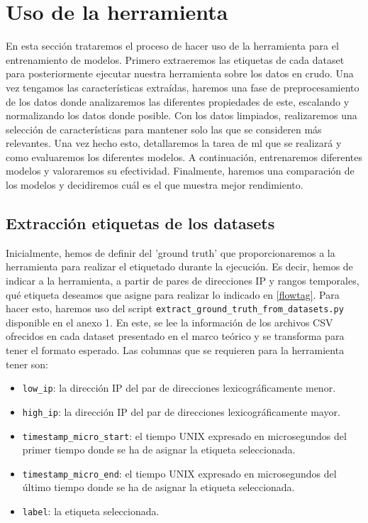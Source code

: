 \color{blue} %
\section{Uso de la herramienta}

En esta sección trataremos el proceso de hacer uso de la herramienta para el entrenamiento de modelos. Primero extraeremos las etiquetas de cada dataset para posteriormente ejecutar nuestra herramienta sobre los datos en crudo. Una vez tengamos las características extraídas, haremos una fase de preprocesamiento de los datos donde analizaremos las diferentes propiedades de este, escalando y normalizando los datos donde posible. Con los datos limpiados, realizaremos una selección de características para mantener solo las que se consideren más relevantes. Una vez hecho esto, detallaremos la tarea de \gls{ml} que se realizará y como evaluaremos los diferentes modelos. A continuación, entrenaremos diferentes modelos y valoraremos su efectividad. Finalmente, haremos una comparación de los modelos y decidiremos cuál es el que muestra mejor rendimiento.

\subsection{Extracción etiquetas de los datasets}

Inicialmente, hemos de definir del 'ground truth' que proporcionaremos a la herramienta para realizar el etiquetado durante la ejecución. Es decir, hemos de indicar a la herramienta, a partir de pares de direcciones IP y rangos temporales, qué etiqueta deseamos que asigne para realizar lo indicado en \ref{flowtag}. Para hacer esto, haremos uso del script \texttt{extract\-\_ground\-\_truth\-\_from\-\_datasets.py} disponible en el anexo 1. En este, se lee la información de los archivos CSV ofrecidos en cada dataset presentado en el marco teórico y se transforma para tener el formato esperado. Las columnas que se requieren para la herramienta tener son:

\begin{itemize}
    \item \texttt{low\_ip}: la dirección IP del par de direcciones lexicográficamente menor.
    \item \texttt{high\_ip}: la dirección IP del par de direcciones lexicográficamente mayor.
    \item \texttt{timestamp\_micro\_start}: el tiempo UNIX expresado en microsegundos del primer tiempo donde se ha de asignar la etiqueta seleccionada.
    \item \texttt{timestamp\_micro\_end}:  el tiempo UNIX expresado en microsegundos del último tiempo donde se ha de asignar la etiqueta seleccionada.
    \item \texttt{label}: la etiqueta seleccionada.
\end{itemize}

